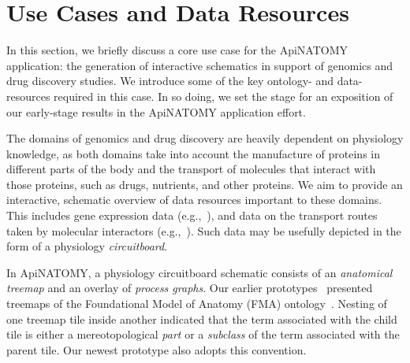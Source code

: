\section{Use Cases and Data Resources} \label{sect:motivation}                           %

In this section, we briefly discuss a core use case for the ApiNATOMY application: the generation of
interactive schematics in support of genomics and drug discovery studies. We introduce some of the
key ontology- and data-resources required in this case. In so doing, we set the stage for an
exposition of our early-stage results in the ApiNATOMY application effort.

The domains of genomics and drug discovery are heavily dependent on physiology knowledge, as both
domains take into account the manufacture of proteins in different parts of the body and the
transport of molecules that interact with those proteins, such as drugs, nutrients, and other
proteins.
We aim to provide an interactive, schematic overview of data resources important to these domains.
This includes gene expression data (e.g.,~\cite{EBI}), and data on the transport routes taken by
molecular interactors (e.g.,~\cite{HMC+13}). Such data may be usefully depicted in the form of a
physiology \emph{circuitboard}.

In ApiNATOMY, a physiology circuitboard schematic consists of an \emph{anatomical treemap} and an
overlay of \emph{process graphs}. Our earlier prototypes~\cite{BGS12,KBK14} presented treemaps of
the Foundational Model of Anatomy (FMA) ontology~\cite{RM03}. Nesting of one treemap tile inside
another indicated that the term associated with the child tile is either a mereotopological
\emph{part} or a \emph{subclass} of the term associated with the parent tile. Our newest prototype
also adopts this convention.

